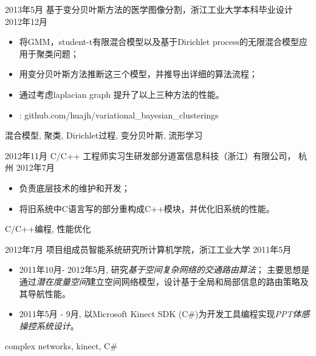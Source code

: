 \begin{experiences}
  \emptySeparator
  \experience
  {2013年5月} {基于变分贝叶斯方法的医学图像分割}{，浙江工业大学}{本科毕业设计}
  {2012年12月 }    {
				  	\begin{itemize}
				  		\item 将GMM，student-t有限混合模型以及基于Dirichlet process的无限混合模型应用于聚类问题；
				  		\item 用变分贝叶斯方法推断这三个模型，并推导出详细的算法流程；
				  		\item 通过考虑laplacian graph 提升了以上三种方法的性能。
				  		\item \faGithub:  {github.com/huajh/variational\_bayesian\_clusterings}                                                                                    
				  	\end{itemize}
				  }
				  {混合模型, 聚类, Dirichlet过程, 变分贝叶斯, 流形学习}

  \emptySeparator
  \experience
  {2012年11月} {C/C++ 工程师实习生}{研发部分}{道富信息科技（浙江）有限公司， 杭州}
  {2012年7月}    {
  	\begin{itemize}
  		\item  负责底层技术的维护和开发；
  		\item  将旧系统中C语言写的部分重构成C++模块，并优化旧系统的性能。
  	\end{itemize}
  }
  {C/C++编程, 性能优化}
  	
  \emptySeparator
  \experience
  {2012年7月} {项目组成员}{智能系统研究所}{计算机学院，浙江工业大学}
  {2011年5月 }    {
				  	\begin{itemize}
				  		\item  2011年10月- 2012年5月, 研究\emph{基于空间复杂网络的交通路由算法}；
				  		主要思想是通过\emph{潜在度量空间}建立空间网络模型，设计基于全局和局部信息的路由策略及其导航性能。
				  		\item  2011年5月 - 9月,  以Microsoft Kinect SDK (C\#)为开发工具编程实现\emph{PPT体感操控系统设计}。
				  	\end{itemize}
				  }
				  {complex networks, kinect, C\#}

	
		  				  

\end{experiences}
